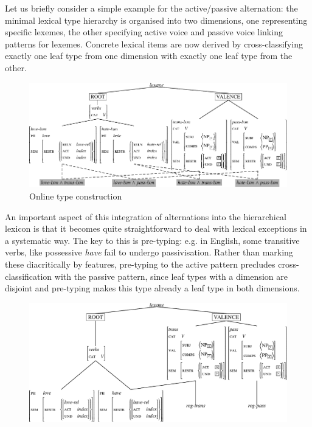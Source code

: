 \documentclass[output=paper
                ,modfonts
                ,nonflat
	        ,collection
	        ,collectionchapter
	        ,collectiontoclongg
 	        ,biblatex
                ,babelshorthands
                ,newtxmath
                ,draftmode
                ,colorlinks, citecolor=brown
] {langscibook}
\begin{document}
{Let us briefly consider a simple example for the active/passive
alternation: the minimal lexical type hierarchy is organised into two
dimensions, one representing specific lexemes, the other specifying
active voice and passive voice linking patterns for lexemes. Concrete
lexical items are now derived by cross-classifying exactly one leaf
type from one dimension with exactly one leaf type from the other.

\begin{figure}[htb]
  \centering
  \includegraphics[scale=.84]{figures/OTC-crop.pdf}
  
  \caption{Online type construction}
  \label{fig:KoenigDyn}
\end{figure}

An important aspect of this integration of alternations
into the hierarchical lexicon is that it becomes quite straightforward 
to deal with lexical exceptions in a systematic way. The key to this
is pre-typing: e.g. in English, some transitive verbs, like possessive
\textit{have} fail to undergo passivisation. Rather than marking these
diacritically by features, pre-typing to the active pattern precludes
cross-classification with the passive pattern, since leaf types with a
dimension are disjoint and pre-typing makes this type already a leaf
type in both dimensions. 

\begin{figure}[htb]
  \centering
  \includegraphics[scale=.63]{figures/pretyping-crop.pdf}


\end{figure}}
\end{document}
